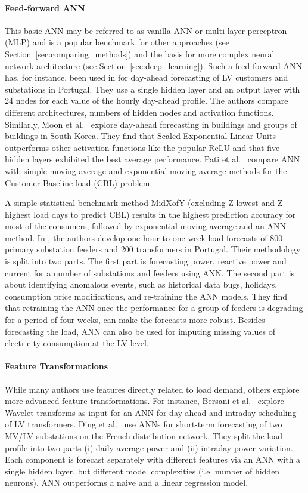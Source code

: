 \paragraph{Feed-forward ANN} This basic ANN may be referred to as vanilla ANN or multi-layer perceptron (MLP) and is a popular benchmark for other approaches (see Section~\ref{sec:comparing_methods}) and the basis for more complex neural network architecture (see Section~\ref{sec:deep_learning}). Such a feed-forward ANN has, for instance, been used in \cite{sousa2012atr} for day-ahead forecasting of LV customers and substations in Portugal. They use a single hidden layer and an output layer with 24 nodes for each value of the hourly day-ahead profile. The authors compare different architectures, numbers of hidden nodes and activation functions. Similarly, Moon et al.~\cite{moon2019aca} explore day-ahead forecasting in buildings and groups of buildings in South Korea. They find that Scaled Exponential Linear Units outperforms other activation functions like the popular ReLU and that five hidden layers exhibited the best average performance. Pati et al.~\cite{pati2020mfc} compare ANN with simple moving average and exponential moving average methods for the Customer Baseline load (CBL) problem. 

A simple statistical benchmark method MidXofY (excluding Z lowest and Z highest load days to predict CBL)  results in the highest prediction accuracy for most of the consumers, followed by exponential moving average and an ANN method. In \cite{fidalgo2005lfp}, the authors develop one-hour to one-week load forecasts of 800 primary substation feeders and 200 transformers in Portugal. Their methodology is split into two parts. The first part is forecasting power, reactive power and current for a number of substations and feeders using ANN. The second part is about identifying anomalous events, such as historical data bugs, holidays, consumption price modifications, and re-training the ANN models. They find that retraining the ANN once the performance for a group of feeders is degrading for a period of four weeks, can make the forecasts more robust. Besides forecasting the load, ANN can also be used for imputing missing values of electricity consumption at the LV level.


\paragraph{Feature Transformations} While many authors use features directly related to load demand, others explore more advanced feature transformations. 
For instance, Bersani et al.~
\cite{bersani2006mol} explore Wavelet transforms as input for an ANN for day-ahead and intraday scheduling of LV transformers. Ding et al.~\cite{ding2016nnb} use ANNs for short-term forecasting of two MV/LV substations on the French distribution network. They split the load profile into two parts (i) daily average power and (ii) intraday power variation. Each component is forecast separately with different features via an ANN with a single hidden layer, but different model complexities (i.e. number of hidden neurons). ANN outperforms a naive and a linear regression model. 


